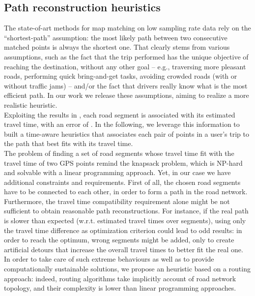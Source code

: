 \documentclass[5p]{elsarticle}
\begin{document}
\subsection{Path reconstruction heuristics}

The state-of-art methods for map matching on low sampling rate data rely on the ``shortest-path'' assumption: the most likely path between two consecutive matched points is always the shortest one. 
That clearly stems from various assumptions, such as the fact that the trip performed has the unique objective of reaching the destination, without any other goal -- e.g., traversing more pleasant roads, performing quick bring-and-get tasks, avoiding crowded roads (with or without traffic jams) -- and/or the fact that drivers really know what is the most efficient path. 
In our work we release these assumptions, aiming to realize a more realistic heuristic. \\
Exploiting the results in \cite{cintia2013gravity}, each road segment is associated with its estimated travel time, with an error of . 
In the following, we leverage this information to built a time-aware heuristics that associates each pair of points in a user's trip to the path that best fits with its travel time. \\

The problem of finding a set of road segments whose travel time fit with the travel time of two GPS points remind the knapsack problem, which is NP-hard and solvable with a linear programming approach. 
Yet, in our case we have additional constraints and requirements. First of all, the chosen road segments have to be connected to each other, in order to form a path in the road network. 
Furthermore, the travel time compatibility requirement alone might be not sufficient to obtain reasonable path reconstructions. For instance, if the real path is slower than expected (w.r.t. estimated travel times over segments), using only the travel time difference as optimization criterion
could lead to odd results: in order to reach the optimum, wrong segments might be added, only to create artificial detours that increase the overall travel times to better fit the real one. 
In order to take care of such extreme behaviours as well as to provide computationally sustainable solutions, we propose an heuristic based on a routing approach: 
indeed, routing algorithms take implicitly account of road network topology, and their complexity is lower than linear programming approaches.\\
\end{document}
